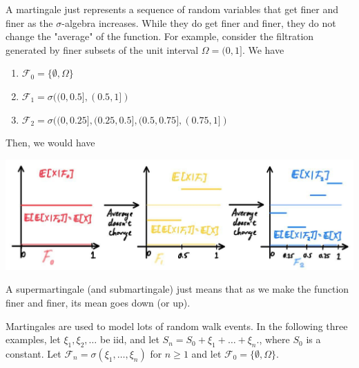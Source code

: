 \documentclass{article}
\begin{document}
  A martingale just represents a sequence of random variables that get finer and finer as the $\sigma$-algebra increases. While they do get finer and finer, they do not change the "average" of the function. For example, consider the filtration generated by finer subsets of the unit interval $\Omega = (0, 1]$. We have 

  \begin{enumerate}
    \item $\mathcal{F}_0 = \{\emptyset, \Omega\}$ 
    \item $\mathcal{F}_1 = \sigma( (0, 0.5], (0.5, 1])$ 
    \item $\mathcal{F}_2 = \sigma( (0, 0.25], (0.25, 0.5], (0.5, 0.75], (0.75, 1] )$
  \end{enumerate}

  Then, we would have 

  \begin{center}
    \includegraphics[scale=0.3]{img/martingale_increments.jpg}
  \end{center}
  
  A supermartingale (and submartingale) just means that as we make the function finer and finer, its mean goes down (or up). 


  Martingales are used to model lots of random walk events. In the following three examples, let $\xi_1, \xi_2, \ldots$ be iid, and let $S_n = S_0 + \xi_1 + \ldots + \xi_n$., where $S_0$ is a constant. Let $\mathcal{F}_n = \sigma(\xi_1, \ldots, \xi_n)$ for $n \geq 1$ and let $\mathcal{F}_0 = \{\emptyset, \Omega\}$. 
\end{document}
